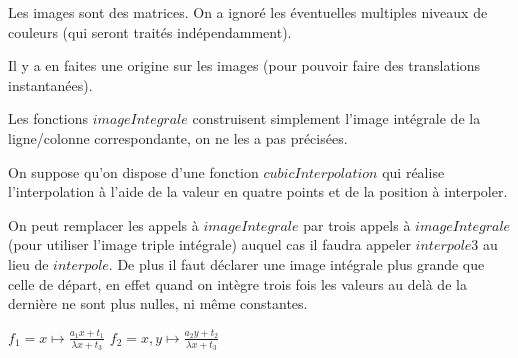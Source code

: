 


Les images sont des matrices. On a ignoré les éventuelles multiples niveaux de couleurs (qui seront traités indépendamment).

Il y a en faites une origine sur les images (pour pouvoir faire des translations instantanées).

\medbreak
Les fonctions $imageIntegrale$ construisent simplement l'image intégrale de la ligne/colonne correspondante, on ne les a pas précisées.

On suppose qu'on dispose d'une fonction $cubicInterpolation$ qui réalise l'interpolation à l'aide de la valeur en quatre points et de la position à interpoler.

On peut remplacer les appels à $imageIntegrale$ par trois appels à $imageIntegrale$ (pour utiliser l'image triple intégrale) auquel cas il faudra appeler $interpole3$ au lieu de $interpole$. De plus il faut déclarer une image intégrale plus grande que celle de départ, en effet quand on intègre trois fois les valeurs au delà de la dernière ne sont plus nulles, ni même constantes.


\begin{algorithm}[H]
\caption{$applyHomography(img,imgf,H)$}
$f_1 = x\mapsto \frac{a_1x + t_1}{\lambda x + t_3}$ \;
$f_2 = x,y\mapsto \frac{a_2y + t_2}{\lambda x + t_3}$ \;
\end{algorithm}


